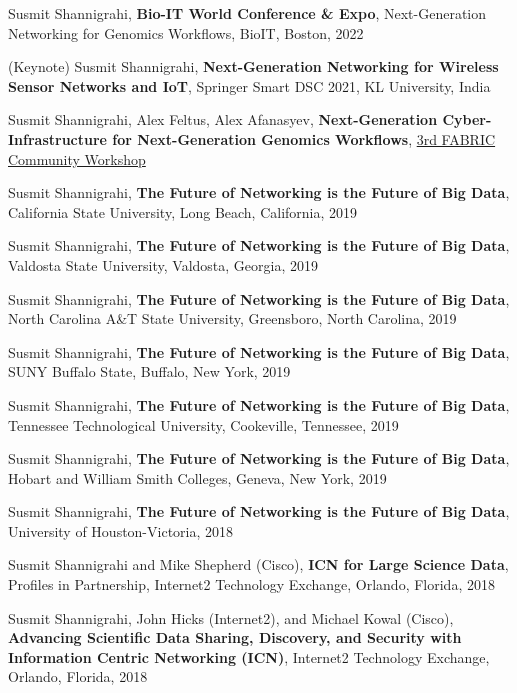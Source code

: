 \begin{etaremune}
\item Susmit Shannigrahi, \textbf{Bio-IT World Conference \& Expo}, Next-Generation Networking for Genomics Workflows, BioIT, Boston, 2022

\item (Keynote) Susmit Shannigrahi, \textbf{Next-Generation Networking for Wireless Sensor Networks and IoT}, Springer Smart DSC 2021, KL University, India

\item Susmit Shannigrahi, Alex Feltus, Alex Afanasyev, \textbf{Next-Generation Cyber-Infrastructure for Next-Generation Genomics Workflows}, \href{https://fabric-testbed.net/events/fabric-experimenters-workshop-2021}{3rd FABRIC Community Workshop}

\item Susmit Shannigrahi, \textbf{The Future of Networking is the Future of Big Data}, California State University, Long Beach, California, 2019

\item Susmit Shannigrahi, \textbf{The Future of Networking is the Future of Big Data}, Valdosta State University, 
Valdosta, Georgia, 2019

\item Susmit Shannigrahi, \textbf{The Future of Networking is the Future of Big Data}, North Carolina A\&T State University, Greensboro, North Carolina, 2019

\item Susmit Shannigrahi, \textbf{The Future of Networking is the Future of Big Data}, SUNY Buffalo State, Buffalo, New York, 2019

\item Susmit Shannigrahi, \textbf{The Future of Networking is the Future of Big Data}, Tennessee Technological University, Cookeville, Tennessee, 2019

\item Susmit Shannigrahi, \textbf{The Future of Networking is the Future of Big Data}, Hobart and William Smith Colleges, Geneva, New York, 2019

\item Susmit Shannigrahi, \textbf{The Future of Networking is the Future of Big Data}, University of Houston-Victoria, 2018

\item Susmit Shannigrahi and Mike Shepherd (Cisco), \textbf{ICN for Large Science Data}, Profiles in Partnership,  Internet2 Technology Exchange, Orlando, Florida, 2018

\item Susmit Shannigrahi, John Hicks (Internet2), and Michael Kowal (Cisco),  \textbf{Advancing Scientific Data Sharing, Discovery, and Security with Information Centric Networking (ICN)}, Internet2 Technology Exchange, Orlando, Florida, 2018


\end{etaremune}
